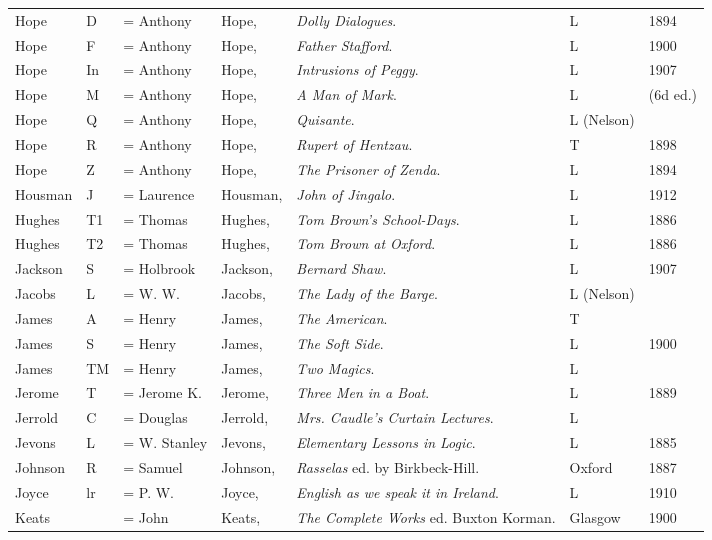 \begin{sidewaystable}
\centering\small
\begin{tabular}{p{} p{} p{} p{} p{} p{} p{}}
Hope& D & = Anthony & Hope, & \textit{Dolly Dialogues}. & L & 1894 \\
Hope& F & = Anthony & Hope, & \textit{Father Stafford}. & L & 1900 \\
Hope& In & = Anthony & Hope, & \textit{Intrusions of Peggy}. & L & 1907 \\
Hope& M & = Anthony & Hope, & \textit{A Man of Mark}. & L & (6d ed.) \\
Hope& Q & = Anthony & Hope, & \textit{Quisante}. & L (Nelson) &  \\
Hope& R & = Anthony & Hope, & \textit{Rupert of Hentzau}. & T & 1898 \\
Hope& Z & = Anthony & Hope, & \textit{The Prisoner of Zenda}. & L & 1894 \\
Housman & J & = Laurence & Housman, & \textit{John of Jingalo}. & L & 1912 \\
Hughes & T1 & = Thomas & Hughes, & \textit{Tom Brown's School-Days}. & L & 1886 \\
Hughes& T2 & = Thomas & Hughes, & \textit{Tom Brown at Oxford}. & L & 1886 \\
Jackson & S & = Holbrook & Jackson, & \textit{Bernard Shaw}. & L & 1907 \\
Jacobs & L & = W. W. & Jacobs, & \textit{The Lady of the Barge}. & L (Nelson)&  \\
James & A & = Henry & James, & \textit{The American}. & T & \\
James& S & = Henry & James, & \textit{The Soft Side}. & L & 1900 \\
James& TM & = Henry & James, & \textit{Two Magics}. & L & \\
Jerome & T & = Jerome K. & Jerome, & \textit{Three Men in a Boat}. & L & 1889 \\
Jerrold & C & = Douglas & Jerrold, & \textit{Mrs. Caudle's Curtain Lectures}. & L & \\
Jevons & L & = W. Stanley & Jevons, & \textit{Elementary Lessons in Logic}. & L & 1885 \\
Johnson & R & = Samuel & Johnson, & \textit{Rasselas} ed. by Birkbeck-Hill. & Oxford & 1887 \\
Joyce & lr & = P. W. & Joyce, & \textit{English as we speak it in Ireland}. & L & 1910 \\
Keats & & = John & Keats, & \textit{The Complete Works} ed. Buxton Korman. & Glasgow & 1900 \\

\end{tabular}
\end{sidewaystable}
